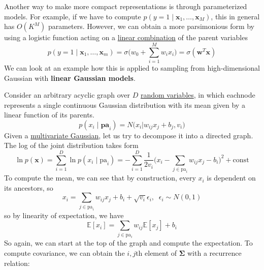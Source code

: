 \documentclass{article}
\begin{document}
  Another way to make more compact representations is through parameterized models. For example, if we have to compute $p(y = 1 \mid \mathbf{x}_1, \ldots, \mathbf{x}_M)$, this in general has $O(K^M)$ parameters. However, we can obtain a more parsimonious form by using a logistic function acting on a \hyperref[lin-def:linear-combination]{linear combination} of the parent variables 
  \begin{equation}
    p(y = 1 \mid \mathbf{x}_1, \ldots, \mathbf{x}_m) = \sigma \bigg( w_0 + \sum_{i=1}^M w_i x_i \bigg) = \sigma(\mathbf{w}^T \mathbf{x})
  \end{equation}
  We can look at an example how this is applied to sampling from high-dimensional Gaussian with \textbf{linear Gaussian models}.  


  \begin{example}
    \label{ex:multivariate-gaussian}
    Consider an arbitrary acyclic graph over $D$ \hyperref[prob-def:random-variable]{random variables}, in which eachnode represents a single continuous Gaussian distribution with its mean given by a linear function of its parents. 
    \begin{equation}
      p(x_i \mid \mathbf{pa}_i) = N \bigg( x_i \bigg| w_{ij} x_j + b_j, v_i \bigg)
    \end{equation}
    Given a \hyperref[prob-def:multivariate-gaussian]{multivariate Gaussian}, let us try to decompose it into a directed graph. The log of the joint distribution takes form 
    \begin{equation}
      \ln p(\mathbf{x}) = \sum_{i=1}^D \ln p(x_i \mid \mathrm{pa}_i) = - \sum_{i=1}^D \frac{1}{2 v_i} \bigg( x_i - \sum_{j \in \mathrm{pa}_i} w_{ij} x_j - b_i \bigg)^2 + \mathrm{const}
    \end{equation}
    To compute the mean, we can see that by construction, every $x_i$ is dependent on its ancestors, so 
    \begin{equation}
      x_i = \sum_{j \in \mathrm{pa}_i} w_{ij} x_j + b_i + \sqrt{v_i} \epsilon_i, \;\; \epsilon_i \sim N(0, 1)
    \end{equation}
    so by linearity of expectation, we have 
    \begin{equation}
      \mathbb{E}[x_i] = \sum_{j \in \mathrm{pa}_i} w_{ij} \mathbb{E}[x_j] + b_i
    \end{equation}
    So again, we can start at the top of the graph and compute the expectation. To compute covariance, we can obtain the $i, j$th element of $\boldsymbol{\Sigma}$ with a recurrence relation: 

\end{example}
\end{document}
